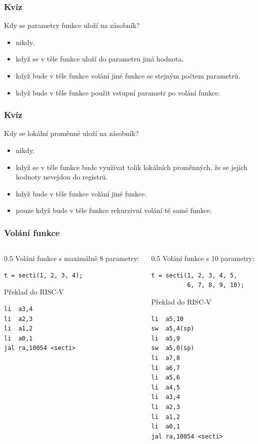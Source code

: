 \documentclass{beamer}
\begin{document}
\begin{frame}
\frametitle{Kvíz}

Kdy se parametry funkce uloží na zásobník?
\begin{itemize}
 \item[A] nikdy.
 \item[B] když se v těle funkce uloží do parametru jiná hodnota.
 \item[C] když bude v těle funkce volání jiné funkce se stejným počtem parametrů.
 \item[D] když bude v těle funkce použit vstupní parametr po volání funkce.
\end{itemize}
\end{frame}


\begin{frame}
\frametitle{Kvíz}

Kdy se lokální proměnné uloží na zásobník?
\begin{itemize}
 \item[A] nikdy.
 \item[B] když se v těle funkce bude využívat tolik lokálních proměnných, že se jejich hodnoty nevejdou do registrů.
 \item[C] když bude v těle funkce volání jiné funkce.
 \item[D] pouze když bude v těle funkce rekurzivní volání té samé funkce.
\end{itemize}
\end{frame}


\begin{frame}[fragile]
\frametitle{Volání funkce}

\begin{columns}
\begin{column}{0.5\textwidth}
Volání funkce s maximálně 8 parametry:

\begin{verbatim}
t = secti(1, 2, 3, 4);
\end{verbatim}

Překlad do RISC-V
\begin{verbatim}
li  a3,4
li  a2,3
li  a1,2
li  a0,1
jal ra,10054 <secti>
\end{verbatim}

\end{column}
\begin{column}{0.5\textwidth}  
Volání funkce s 10 parametry:

\begin{verbatim}
t = secti(1, 2, 3, 4, 5, 
          6, 7, 8, 9, 10);
\end{verbatim}

Překlad do RISC-V
\begin{verbatim}
li  a5,10
sw  a5,4(sp)
li  a5,9
sw  a5,0(sp)
li  a7,8
li  a6,7
li  a5,6
li  a4,5
li  a3,4
li  a2,3
li  a1,2
li  a0,1
jal ra,10054 <secti>
\end{verbatim}
\end{column}
\end{columns}
\end{frame}
\end{document}
